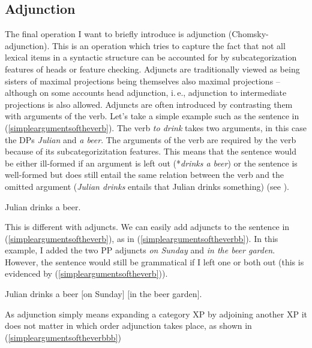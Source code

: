 \subsection{Adjunction}\label{generaladjunction}
The final operation I want to briefly introduce is adjunction (Chomsky-adjunction). This is an operation which tries to capture the fact that not all lexical items in a syntactic structure can be accounted for by subcategorization features of heads or feature checking. Adjuncts are traditionally viewed as being sisters of maximal projections being themselves also maximal projections -- although on some accounts head adjunction, i.\,e., adjunction to intermediate projections is also allowed. Adjuncts are often introduced by contrasting them with arguments of the verb. Let's take a simple example such as the sentence in (\ref{simpleargumentsoftheverb}). The verb \textit{to drink} takes two arguments, in this case the DPs \textit{Julian} and \textit{a beer}. The arguments of the verb are required by the verb because of its subcategorizitation features. This means that the sentence would be either ill-formed if an argument is left out (*\textit{drinks a beer}) or the sentence is well-formed but does still entail the same relation between the verb and the omitted argument (\textit{Julian drinks} entails that Julian drinks something) (see \citealt{hole2015arguments}).

\begin{exe}
\ex\label{simpleargumentsoftheverb} Julian drinks a beer.
\end{exe}

\noindent This is different with adjuncts. We can easily add adjuncts to the sentence in (\ref{simpleargumentsoftheverb}), as in (\ref{simpleargumentsoftheverbb}). In this example, I added the two PP adjuncts \textit{on Sunday} and \textit{in the beer garden}. However, the sentence would still be grammatical if I left one or both out (this is evidenced by (\ref{simpleargumentsoftheverb})). 

\begin{exe}
\ex\label{simpleargumentsoftheverbb} Julian drinks a beer $[$on Sunday$]$ $[$in the beer garden$]$.
\end{exe}

\noindent As adjunction simply means expanding a category XP by adjoining another XP it does not matter in which order adjunction takes place, as shown in (\ref{simpleargumentsoftheverbbb})


